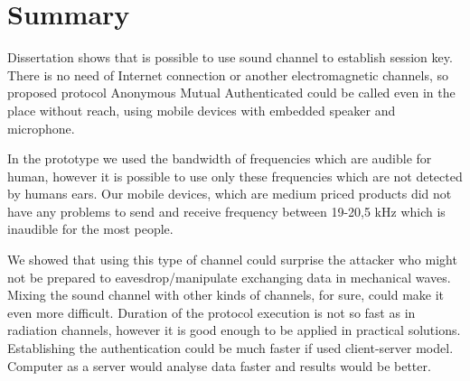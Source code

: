 \documentclass[11pt,titlepage]{article}
\theoremstyle{plain}
\begin{document}
\section{Summary}

Dissertation shows that is possible to use sound channel to establish session key. There is no need of Internet connection or another electromagnetic channels, so proposed protocol Anonymous Mutual Authenticated could be called even in the place without reach, using mobile devices with embedded speaker and microphone. 

\vspace{5mm}


In the prototype we used the bandwidth of frequencies which are audible for human, however it is possible to use only these frequencies which are not detected by humans ears. Our mobile devices, which are medium priced products did not have any problems to send and receive frequency between 19-20,5 kHz which is inaudible for the most people.

\vspace{5mm}

We showed that using this type of channel could surprise the attacker who might not be prepared to eavesdrop/manipulate exchanging data in mechanical waves. Mixing the sound channel with other kinds of channels, for sure, could make it even more difficult. Duration of the protocol execution is not so fast as in radiation channels, however it is good enough to be applied in practical solutions. Establishing the authentication could be much faster if used client-server model. Computer as a server would analyse data faster and results would be better.







\end{document}
